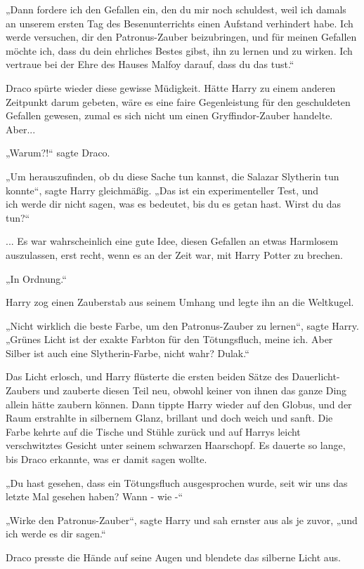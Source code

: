 {„Dann fordere ich den Gefallen ein, den du mir noch schuldest, weil ich damals an unserem ersten Tag des Besenunterrichts einen Aufstand verhindert habe. Ich werde versuchen, dir den Patronus-Zauber beizubringen, und für meinen Gefallen möchte ich, dass du dein ehrliches Bestes gibst, ihn zu lernen und zu wirken. Ich vertraue bei der Ehre des Hauses Malfoy darauf, dass du das tust.“

Draco spürte wieder diese gewisse Müdigkeit. Hätte Harry zu einem anderen Zeitpunkt darum gebeten, wäre es eine faire Gegenleistung für den geschuldeten Gefallen gewesen, zumal es sich nicht um einen Gryffindor-Zauber handelte. Aber...

„Warum?!“ sagte Draco.

„Um herauszufinden, ob du diese Sache tun kannst, die Salazar Slytherin tun konnte“, sagte Harry gleichmäßig. „Das ist ein experimenteller Test, und\\ ich werde dir nicht sagen, was es bedeutet, bis du es getan hast. Wirst du das tun?“

... Es war wahrscheinlich eine gute Idee, diesen Gefallen an etwas Harmlosem auszulassen, erst recht, wenn es an der Zeit war, mit Harry Potter zu brechen.

„In Ordnung.“

Harry zog einen Zauberstab aus seinem Umhang und legte ihn an die Weltkugel.

„Nicht wirklich die beste Farbe, um den Patronus-Zauber zu lernen“, sagte Harry. „Grünes Licht ist der exakte Farbton für den Tötungsfluch, meine ich. Aber Silber ist auch eine Slytherin-Farbe, nicht wahr? Dulak.“

Das Licht erlosch, und Harry flüsterte die ersten beiden Sätze des Dauerlicht-Zaubers und zauberte diesen Teil neu, obwohl keiner von ihnen das ganze Ding allein hätte zaubern können. Dann tippte Harry wieder auf den Globus, und der Raum erstrahlte in silbernem Glanz, brillant und doch weich und sanft. Die Farbe kehrte auf die Tische und Stühle zurück und auf Harrys leicht verschwitztes Gesicht unter seinem schwarzen Haarschopf. Es dauerte so lange, bis Draco erkannte, was er damit sagen wollte.

„Du hast gesehen, dass ein Tötungsfluch ausgesprochen wurde, seit wir uns das letzte Mal gesehen haben? Wann - wie -“

„Wirke den Patronus-Zauber“, sagte Harry und sah ernster aus als je zuvor, „und ich werde es dir sagen.“

Draco presste die Hände auf seine Augen und blendete das silberne Licht aus.

}
